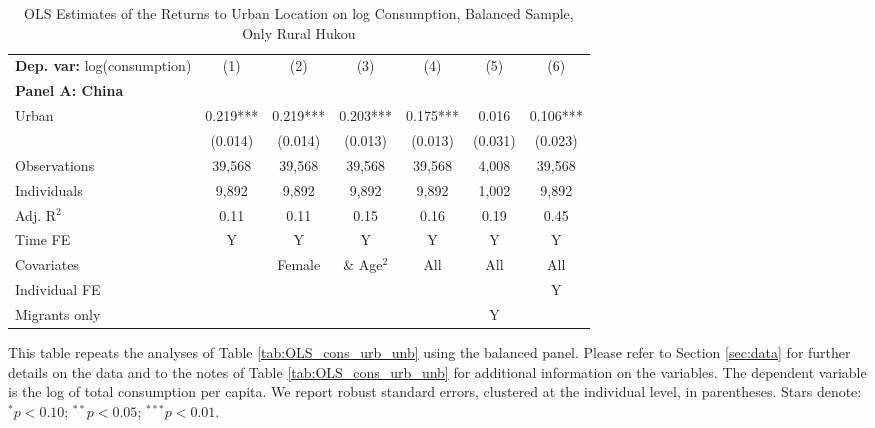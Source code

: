 \begin{table}[htbp] \centering \begin{threeparttable}
 \caption{OLS Estimates of the Returns to Urban Location on log Consumption, Balanced Sample, Only Rural Hukou} 
 \label{tab:OLS_CHN_hukou_rural_only_consumption_urban_bal} 
\begin{tabular}{l cccccc} \toprule  \textbf{Dep. var:}  log(consumption) 
                    &\multicolumn{1}{c}{(1)}   &\multicolumn{1}{c}{(2)}   &\multicolumn{1}{c}{(3)}   &\multicolumn{1}{c}{(4)}   &\multicolumn{1}{c}{(5)}   &\multicolumn{1}{c}{(6)}   \\
\textbf{Panel A: China} \\
Urban               &       0.219***&       0.219***&       0.203***&       0.175***&       0.016   &       0.106***\\
                    &     (0.014)   &     (0.014)   &     (0.013)   &     (0.013)   &     (0.031)   &     (0.023)   \\
\addlinespace
Observations        &      39,568   &      39,568   &      39,568   &      39,568   &       4,008   &      39,568   \\
Individuals         &       9,892   &       9,892   &       9,892   &       9,892   &       1,002   &       9,892   \\
Adj. R$^{2}$        &        0.11   &        0.11   &        0.15   &        0.16   &        0.19   &        0.45   \\
\cmidrule{2 -7} Time FE & Y & Y & Y & Y & Y & Y \\ Covariates & & Female & \& Age$^2$ & All & All & All \\ Individual FE & & & & & & Y \\ Migrants only & & & & & Y & \\ \bottomrule \end{tabular} \begin{tablenotes}[flushleft] \footnotesize \item{This table repeats the analyses of Table \ref{tab:OLS_cons_urb_unb}  using the balanced panel. Please refer to Section \ref{sec:data} for further details on the data and to the notes of Table \ref{tab:OLS_cons_urb_unb} for additional information on the variables. The dependent variable is the log of total consumption per capita. We report robust standard errors, clustered at the individual level, in parentheses. Stars denote: $^{*} p<0.10$; $^{**} p<0.05$; $^{***} p<0.01$.} \end{tablenotes} \end{threeparttable} \end{table}
